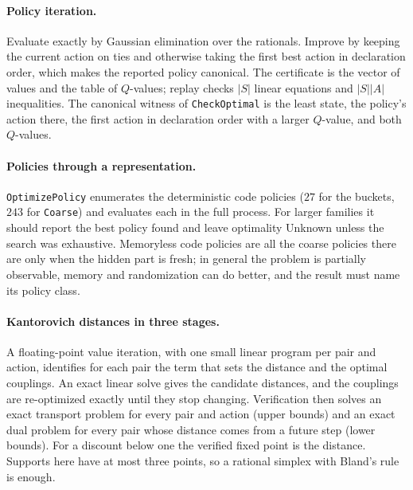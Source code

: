 \documentclass[11pt]{article}
\newcommand{\code}[1]{\texttt{#1}}
\theoremstyle{definition}
\theoremstyle{plain}
\begin{document}
\paragraph{Policy iteration.} Evaluate exactly by Gaussian elimination over the rationals. Improve by
keeping the current action on ties and otherwise taking the first best action in declaration order,
which makes the reported policy canonical. The certificate is the vector of values and the table of
$Q$-values; replay checks $|S|$ linear equations and $|S||A|$ inequalities. The canonical witness of
\code{CheckOptimal} is the least state, the policy's action there, the first action in declaration order
with a larger $Q$-value, and both $Q$-values.

\paragraph{Policies through a representation.} \code{OptimizePolicy} enumerates the deterministic code
policies ($27$ for the buckets, $243$ for \code{Coarse}) and evaluates each in the full process. For larger
families it should report the best policy found and leave optimality Unknown unless the search was
exhaustive. Memoryless code policies are all the coarse policies there are only when the hidden part is
fresh; in general the problem is partially observable, memory and randomization can do better, and the
result must name its policy class.

\paragraph{Kantorovich distances in three stages.} A floating-point value iteration, with one small
linear program per pair and action, identifies for each pair the term that sets the distance and the
optimal couplings. An exact linear solve gives the candidate distances, and the couplings are
re-optimized exactly until they stop changing. Verification then solves an exact transport problem for
every pair and action (upper bounds) and an exact dual problem for every pair whose distance comes from a
future step (lower bounds). For a discount below one the verified fixed point is the distance. Supports
here have at most three points, so a rational simplex with Bland's rule \cite{bland} is enough.
\end{document}
